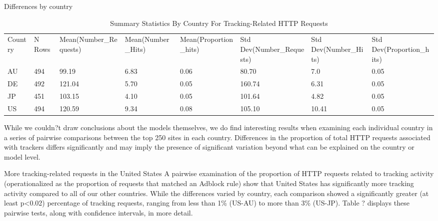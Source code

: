 \documentclass[journal]{IEEEtran}
\begin{document}
Differences by country

\begin{table}
\centering
\caption{Summary Statistics By Country For Tracking-Related HTTP Requests}
\label{trackingbycountry}
   \begin{tabular}{llllllll}
    Country & N Rows & Mean(Number\_Requests) & Mean(Number\_Hits) & Mean(Proportion\_hits) & Std Dev(Number\_Requests) & Std Dev(Number\_Hits) & Std Dev(Proportion\_hits) \\
   AU       & 494    & 99.19                  & 6.83               & 0.06                   & 80.70                     & 7.0                   & 0.05                      \\
   DE       & 492    & 121.04                 & 5.70               & 0.05                   & 160.74                    & 6.31                  & 0.05                      \\
   JP       & 451    & 103.15                 & 4.10               & 0.05                   & 101.64                    & 4.82                  & 0.05                      \\
   US       & 494    & 120.59                 & 9.34               & 0.08                   & 105.10                    & 10.41                 & 0.05                      \\
   \end{tabular}
\end{table}



While we couldn?t draw conclusions about the models themselves, we do find interesting results when examining each individual country in a series of pairwise comparisons between the top 250 sites in each country.  Differences in the proportion of total HTTP requests associated with trackers differs significantly and may imply the presence of significant variation beyond what can be explained on the country or model level.

More tracking-related requests in the United States
A pairwise examination of the proportion of HTTP requests related to tracking activity (operationalized as the proportion of requests that matched an Adblock rule) show that United States has significantly more tracking activity compared to all of our other countries. While the differences varied by country, each comparison showed a significantly greater (at least p<0.02) percentage of tracking requests, ranging from less than 1\% (US-AU) to more than 3\% (US-JP). Table ? displays these pairwise tests, along with confidence intervals, in more detail.
\end{document}

